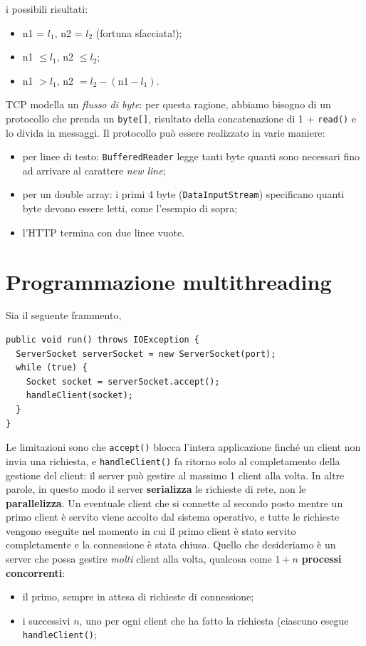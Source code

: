 \documentclass[\fontsizeclass,twocolumn]{\classname}
\theoremstyle{definition}
\theoremstyle{definition}
\begin{document}
i possibili risultati:
\begin{itemize}
    \item n1 = $l_1$, n2 = $l_2$ (fortuna sfacciata!);
    \item n1 $\leq l_1$, n2 $\leq l_2$;
    \item n1 $> l_1$, n2 $ = l_2 - (\mathrm{ n1 } - l_1)$.
\end{itemize}

TCP modella un \emph{flusso di byte}: per questa ragione, abbiamo bisogno di un
protocollo che prenda un \texttt{byte[]}, risultato della concatenazione di 1 +
\texttt{read()} e lo divida in messaggi. Il protocollo può essere realizzato in
varie maniere:
\begin{itemize}
    \item per linee di testo: \texttt{BufferedReader} legge tanti byte quanti
        sono necessari fino ad arrivare al carattere \emph{new line};
    \item per un double array: i primi 4 byte (\texttt{DataInputStream})
        specificano quanti byte devono essere letti, come l'esempio di sopra;
    \item l'HTTP termina con due linee vuote.
\end{itemize}

\chapter{Programmazione multithreading}

Sia il seguente frammento,

\begin{lstlisting}
public void run() throws IOException {
  ServerSocket serverSocket = new ServerSocket(port);
  while (true) {
    Socket socket = serverSocket.accept();
    handleClient(socket);
  }
}
\end{lstlisting}

Le limitazioni sono che \texttt{ac\-cept()} blocca l'intera applicazione finché
un client non invia una richiesta, e \texttt{handleClient()} fa ritorno solo al
completamento della gestione del client: il server può gestire al massimo 1
client alla volta. In altre parole, in questo modo il server
\textbf{serializza} le richieste di rete, non le \textbf{parallelizza}. Un
eventuale client che si connette al secondo posto mentre un primo client è
servito viene accolto dal sistema operativo, e tutte le richieste vengono
eseguite nel momento in cui il primo client è stato servito completamente e la
connessione è stata chiusa. Quello che desideriamo è un server che possa gestire \emph{molti} client alla volta, qualcosa come $1 + n$ \textbf{processi concorrenti}:
\begin{itemize}
    \item il primo, sempre in attesa di richieste di connessione;
    \item i successivi $n$, uno per ogni client che ha fatto la richiesta
        (ciascuno esegue \texttt{handleClient()};
\end{itemize}
\end{document}
